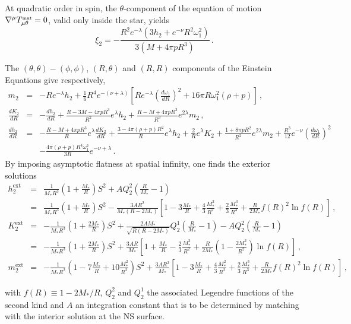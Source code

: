 \documentclass[aps,twocolumn,nofootinbib,showpacs,superscriptaddress,hyperref]{revtex4-1}
\newcommand\be{\begin{equation}}
\newcommand\ba{\begin{eqnarray}}
\newcommand\ee{\end{equation}}
\newcommand\ea{\end{eqnarray}}
\newcommand\bw{\begin{widetext}}
\newcommand\ew{\end{widetext}}
\newcommand{\nn}{\nonumber}
\newcommand{\MAT}{{\mbox{\tiny mat}}}
\newcommand{\NS}{*}
\newcommand{\ext}{\mathrm{ext}}
\begin{document}
At quadratic order in spin, the $\theta$-component of the equation of motion $\nabla^{\mu} T_{\mu\theta}^\MAT=0$, valid only inside the star, yields
%
\be
\xi_2 = -\frac{R^2 e^{-\lambda} (3 h_2+e^{-\nu} R^2 \omega_1^2)}{3(M+4\pi p R^3)}\,.
\label{xi2}
\ee
%
\bw
The $(\theta,\theta)-(\phi,\phi)$, $(R,\theta)$ and $(R,R)$ components of the Einstein Equations give respectively,
%
\ba
\label{m2}
m_2 &=& -R e^{-\lambda} h_2  +\frac{1}{6} R^4 e^{-(\nu+\lambda)} \left[ R e^{-\lambda} \left(\frac{d \omega_1}{dR} \right)^2
+ 16 \pi R \omega_1^2 (\rho +p) \right]\,, \\
\label{k2R}
\frac{dK_2}{dR} &=& -\frac{dh_2}{dR} + \frac{R-3M-4\pi pR^3}{R^2} e^{\lambda} h_2 
+ \frac{R-M+4\pi p R^3}{R^3} e^{2\lambda} m_2\,, \\
\label{h2R}
\frac{dh_2}{dR} &=& -\frac{R-M+4 \pi p R^3}{R}e^{\lambda} \frac{dK_2}{dR} +\frac{3-4\pi (\rho +p) R^2}{R} e^{\lambda} h_2 +\frac{2}{R} e^{\lambda} K_2 +\frac{1+8\pi p R^2}{R^2} e^{2\lambda} m_2 +\frac{R^3}{12}e^{-\nu} \left( \frac{d\omega_1}{dR} \right)^2 \nn \\
& & -\frac{4 \pi (\rho +p) R^4 \omega_1^2}{3R}e^{-\nu+\lambda}\,.
\ea
%
By imposing asymptotic flatness at spatial infinity, one finds the exterior solutions ~\cite{hartle1967}
%
\ba
\label{h2-ext}
h_2^\ext &=& \frac{1}{M_\NS R^3} \left( 1 + \frac{M_\NS}{R} \right) S^2  + AQ_2^2 \left( \frac{R}{M_\NS}-1 \right) \nn \\
             &=&  \frac{1}{M_\NS R^3} \left( 1 + \frac{M_\NS}{R} \right) S^2 -\frac{3A R^2}{M_\NS (R-2 M_\NS)} \left[ 1- 3 \frac{M_\NS}{R} + \frac{4}{3} \frac{M_\NS^2}{R^2} + \frac{2}{3} \frac{M_\NS^3}{R^3} + \frac{R}{2 M_\NS} f(R)^2 \ln f(R) \right]\,, \\
%
\label{k2-ext}
K_2^\ext &=& - \frac{1}{M_\NS R^3} \left( 1+\frac{2M_\NS}{R} \right) S^2 + \frac{2AM_\NS}{\sqrt{R (R-2 M_\NS)}}Q_2^1\left( \frac{R}{M_\NS}-1 \right) - AQ_2^2 \left( \frac{R}{M_\NS}-1 \right) \nn \\
              &=& - \frac{1}{M_\NS R^3} \left( 1+\frac{2M_\NS}{R} \right) S^2 + \frac{3AR}{M_\NS} \left[1+ \frac{M_\NS}{R} - \frac{2}{3} \frac{M_\NS^2}{R^2} + \frac{R}{2M_\NS} \left( 1- \frac{2 M_\NS^2}{R^2} \right) \ln f(R)  \right]\,, \\
%
\label{m2-ext}
m_2^\ext &=&  - \frac{1}{M_\NS R^2} \left( 1 -7\frac{M_\NS}{R} + 10 \frac{M_\NS^2}{R^2} \right)S^2 +\frac{3 A R^2}{M_\NS} \left[ 1 - 3 \frac{M_\NS}{R} + \frac{4}{3} \frac{M_\NS^2}{R^2} + \frac{2}{3} \frac{M_\NS^3}{R^3} + \frac{R}{2 M_\NS} f(R)^2 \ln f(R)  \right]\,,
\ea
\ew
%
with $f(R) \equiv 1- 2M_\NS/R$, $Q_2^2$ and $Q_2^1$ the associated Legendre functions of the second kind and $A$ an integration constant that is to be determined by matching with the interior solution at the NS surface. 
\end{document}
